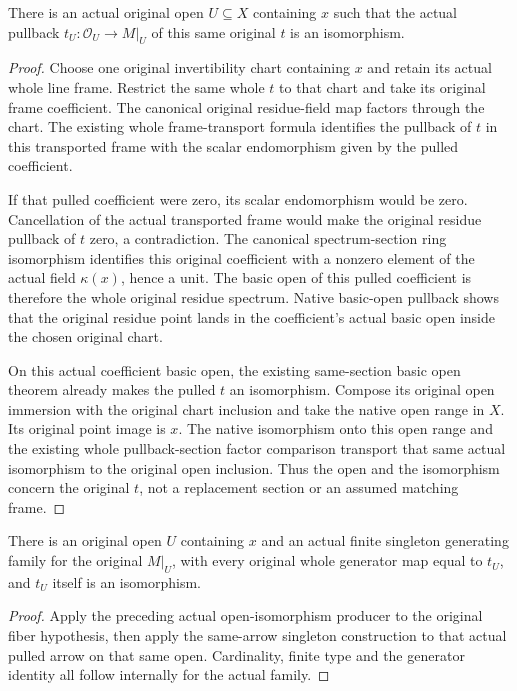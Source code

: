 \begin{theorem}
\label{thm:original-fiber-nonzero-open-section-isomorphism}
\leanok
There is an actual original open $U\subseteq X$ containing $x$ such that
the actual pullback $t_U:\mathcal O_U\to M|_U$ of this same original
$t$ is an isomorphism.
\end{theorem}
\begin{proof}
Choose one original invertibility chart containing $x$ and retain its
actual whole line frame. Restrict the same whole $t$ to that chart and
take its original frame coefficient. The canonical original residue-field
map factors through the chart. The existing whole frame-transport formula
identifies the pullback of $t$ in this transported frame with the scalar
endomorphism given by the pulled coefficient.

If that pulled coefficient were zero, its scalar endomorphism would be
zero. Cancellation of the actual transported frame would make the
original residue pullback of $t$ zero, a contradiction. The canonical
spectrum-section ring isomorphism identifies this original coefficient
with a nonzero element of the actual field $\kappa(x)$, hence a unit.
The basic open of this pulled coefficient is therefore the whole original
residue spectrum. Native basic-open pullback shows that the original
residue point lands in the coefficient's actual basic open inside the
chosen original chart.

On this actual coefficient basic open, the existing same-section basic
open theorem already makes the pulled $t$ an isomorphism. Compose its
original open immersion with the original chart inclusion and take the
native open range in $X$. Its original point image is $x$. The native
isomorphism onto this open range and the existing whole pullback-section
factor comparison transport that same actual isomorphism to the original
open inclusion. Thus the open and the isomorphism concern the original
$t$, not a replacement section or an assumed matching frame.
\end{proof}

\begin{theorem}
\label{thm:original-fiber-nonzero-open-singleton-generation}
\leanok
There is an original open $U$ containing $x$ and an actual finite
singleton generating family for the original $M|_U$, with every original
whole generator map equal to $t_U$, and $t_U$ itself is an isomorphism.
\end{theorem}
\begin{proof}
Apply the preceding actual open-isomorphism producer to the original
fiber hypothesis, then apply the same-arrow singleton construction to
that actual pulled arrow on that same open. Cardinality, finite type
and the generator identity all follow internally for the actual family.
\end{proof}
